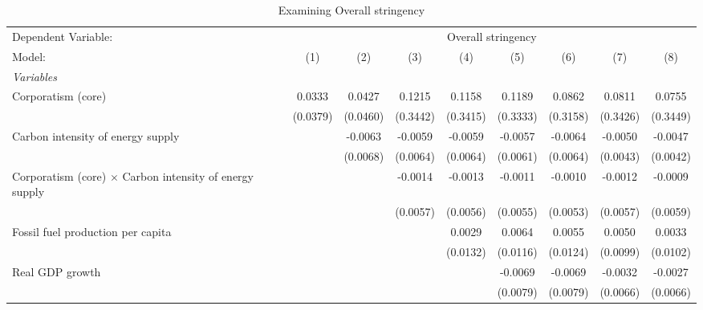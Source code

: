 
\begin{table}[htbp]
   \caption{Examining Overall stringency}
   \centering
   \begin{tabular}{lcccccccc}
      \tabularnewline \midrule \midrule
      Dependent Variable: & \multicolumn{8}{c}{Overall stringency}\\
      Model:                                                         & (1)      & (2)      & (3)      & (4)      & (5)      & (6)      & (7)      & (8)\\  
      \midrule
      \emph{Variables}\\
      Corporatism (core)                                             & 0.0333   & 0.0427   & 0.1215   & 0.1158   & 0.1189   & 0.0862   & 0.0811   & 0.0755\\   
                                                                     & (0.0379) & (0.0460) & (0.3442) & (0.3415) & (0.3333) & (0.3158) & (0.3426) & (0.3449)\\   
      Carbon intensity of energy supply                              &          & -0.0063  & -0.0059  & -0.0059  & -0.0057  & -0.0064  & -0.0050  & -0.0047\\   
                                                                     &          & (0.0068) & (0.0064) & (0.0064) & (0.0061) & (0.0064) & (0.0043) & (0.0042)\\   
      Corporatism (core) $\times$ Carbon intensity of energy supply  &          &          & -0.0014  & -0.0013  & -0.0011  & -0.0010  & -0.0012  & -0.0009\\   
                                                                     &          &          & (0.0057) & (0.0056) & (0.0055) & (0.0053) & (0.0057) & (0.0059)\\   
      Fossil fuel production per capita                              &          &          &          & 0.0029   & 0.0064   & 0.0055   & 0.0050   & 0.0033\\   
                                                                     &          &          &          & (0.0132) & (0.0116) & (0.0124) & (0.0099) & (0.0102)\\   
      Real GDP growth                                                &          &          &          &          & -0.0069  & -0.0069  & -0.0032  & -0.0027\\   
                                                                     &          &          &          &          & (0.0079) & (0.0079) & (0.0066) & (0.0066)\\   

\end{tabular}
\end{table}
